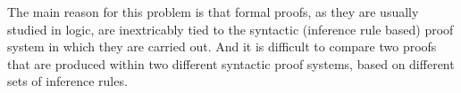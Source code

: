 \documentclass[conference,twosided,10pt]{IEEEtran}
\theoremstyle{definition}
\newcommand{\dual}[1]{\overline{#1}}
\newcommand{\cneg}[1]{\dual{#1}}
\newcommand{\fequ}{\equiv}
\newcommand{\axr}{\mathsf{ax}}
\newcommand{\conr}{\mathsf{ctr}}
\newcommand{\weakr}{\mathsf{wk}}
\newcommand\aiD {\mathsf{ai}}
\newcommand\tttD {\ttt}
\newcommand\wrD {\mathsf{w}}
\renewcommand\acD {\mathsf{ac}}
\newcommand{\sqn}[1]{\vdash#1}
\begin{document}
The main reason for this problem is that formal proofs, as they are
usually studied in logic, are inextricably tied to the syntactic
(inference rule based) proof system in which they are carried out. And
it is difficult to compare two proofs that are produced within two
different syntactic proof systems, based on different sets of inference rules.
%
\newcommand\lkpeirceproof{
\vlderivation{
  \vlin{\vlor}{}{\sqn{\peirceformula}}{
    \vlin{\conr}{}{\sqn{(\cneg{p} \vlor q) \vlan \cneg{p}, p}}{
      \vliin{\vlan}{}{\sqn{(\cneg{p} \vlor q) \vlan \cneg{p}, p, p}}{
        \vlin{\vlor}{}{\sqn{\cneg{p} \vlor q, p}}{
          \vlin{\weakr}{}{\sqn{\cneg{p}, q, p}}{
            \vlin{\axr}{}{\sqn{\cneg{p}, p}}{
              \vlhy{}}}}}{
        \vlin{\axr}{}{\sqn{\cneg{p}, p}}{
          \vlhy{}}}}}}
}
\newcommand\dipeirceproof{
\vlderivation{
  \vlin{\acD}{}{\peirceformula}{
    \vlin{\fequ}{}{((\cneg{p} \vlor q) \vlan \cneg{p}) \vlor (p \vlor p)}{
      \vlin{\sw}{}{(\cneg{p} \vlan (\cneg{p} \vlor q)) \vlor p) \vlor p}{
        \vlin{\fequ}{}{(\cneg{p} \vlan ((\cneg{p} \vlor q) \vlor p)) \vlor p)}{
          \vlin{\sw}{}{(p \vlor (\cneg{p} \vlor q)) \vlan \cneg{p}) \vlor p}{
            \vlin{\aiD}{}{(p \vlor (\cneg{p} \vlor q)) \vlan (\cneg{p} \vlor p)}{
              \vlin{\tttD}{}{(p \vlor (\cneg{p} \vlor q)) \vlan \ttt}{
                \vlin{\fequ}{}{p \vlor (\cneg{p} \vlor q)}{
                  \vlin{\wrD}{}{(p \vlor \cneg{p}) \vlor q}{
                    \vlin{\aiD}{}{p \vlor \cneg{p}}{
                      \vlhy{\ttt}}}}}}}}}}}}
}
\newcommand\lkdrinkerproof{
\vlderivation{
  \vlin{\conr}{}{\sqn{\exists x.(\cneg{p}x \vlor (\forall y.py))}}{
    \vlin{\exists}{}{\sqn{\exists x.(\cneg{p}x \vlor (\forall y.py)),\exists
x.(\cneg{p}x \vlor (\forall y.py))}}{
      \vlin{\vlor}{}{\sqn{\cneg{p}w \vlor (\forall y.py), \exists
x.(\cneg{p}x \vlor (\forall y.p(y)))}}{
        \vlin{\forall}{}{\sqn{\cneg{p}w, \forall y.py, \exists
x.(\cneg{p}x \vlor (\forall y.py))}}{
          \vlin{\exists}{}{\sqn{\cneg{p}w, pz, \exists
x.(\cneg{p}x \vlor (\forall y.py))}}{
            \vlin{\vlor}{}{\sqn{\cneg{p}w, pz, \cneg{p}z \vlor (\forall y.py))}}{
              \vlin{\weakr}{}{\sqn{\cneg{p}w, pz, \cneg{p}z, (\forall y.py))}}{
                \vlin{\weakr}{}{\sqn{\cneg{p}w, pz, \cneg{p}z}}{
                \vlin{\axr}{}{\sqn{pz, \cneg{p}z}}{
                  \vlhy{}}}}}}}}}}}
}
\end{document}
